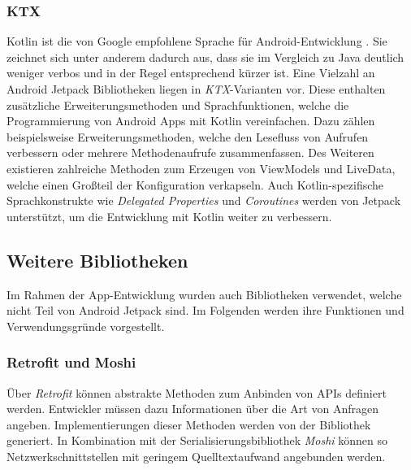 \subsubsection{KTX}
\label{subsubsec:app:jetpack:extensions}
Kotlin ist die von Google empfohlene Sprache für Android-Entwicklung \autocite{androidkotlin}.
Sie zeichnet sich unter anderem dadurch aus, dass sie im Vergleich zu Java deutlich weniger verbos und in der Regel entsprechend kürzer ist.
Eine Vielzahl an Android Jetpack Bibliotheken liegen in \textit{KTX}-Varianten vor.
Diese enthalten zusätzliche Erweiterungsmethoden und Sprachfunktionen, welche die Programmierung von Android Apps mit Kotlin vereinfachen.
Dazu zählen beispielsweise Erweiterungsmethoden, welche den Lesefluss von Aufrufen verbessern oder mehrere Methodenaufrufe zusammenfassen.
Des Weiteren existieren zahlreiche Methoden zum Erzeugen von ViewModels und LiveData, welche einen Großteil der Konfiguration verkapseln.
Auch Kotlin-spezifische Sprachkonstrukte wie \textit{Delegated Properties} und \textit{Coroutines} werden von Jetpack unterstützt, um die Entwicklung mit Kotlin weiter zu verbessern.

\subsection{Weitere Bibliotheken}
\label{subsec:app:bibs}
Im Rahmen der App-Entwicklung wurden auch Bibliotheken verwendet, welche nicht Teil von Android Jetpack sind.
Im Folgenden werden ihre Funktionen und Verwendungsgründe vorgestellt.

\subsubsection{Retrofit und Moshi}
\label{subsubsec:app:bibs:retrofitmoshi}
Über \textit{Retrofit} können abstrakte Methoden zum Anbinden von APIs definiert werden.
Entwickler müssen dazu Informationen über die Art von Anfragen angeben.
Implementierungen dieser Methoden werden von der Bibliothek generiert.
In Kombination mit der Serialisierungsbibliothek \textit{Moshi} können so Netzwerkschnittstellen mit geringem Quelltextaufwand angebunden werden.

